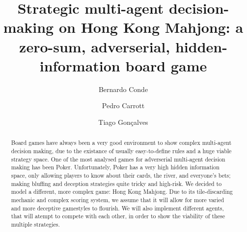 \documentclass{acmart}
\begin{document}
\title{Strategic multi-agent decision-making on Hong Kong Mahjong: a zero-sum, adverserial, hidden-information board game}

\author{Bernardo Conde}
\author{Pedro Carrott}
\author{Tiago Gonçalves}

\renewcommand{\shortauthors}{Conde, Carrott and Gonçalves}

\begin{abstract}
  Board games have always been a very good environment to show complex multi-agent decision making, due to the existance of usually easy-to-define rules
  and a huge viable strategy space. One of the most analysed games for adverserial multi-agent decision making has been Poker.
  Unfortunately, Poker has a very high hidden information space, only allowing players to know about their cards, the river, and everyone's bets;
  making bluffing and deception strategies quite tricky and high-risk.
  We decided to model a different, more complex game: Hong Kong Mahjong. Due to its tile-discarding mechanic and complex scoring system\cite{hkmahjongrules},
  we assume that it will allow for more varied and more deceptive gamestyles to flourish. We will also implement different agents, that will atempt to compete
  with each other, in order to show the viability of these multiple strategies.
\end{abstract}


\maketitle
\end{document}
